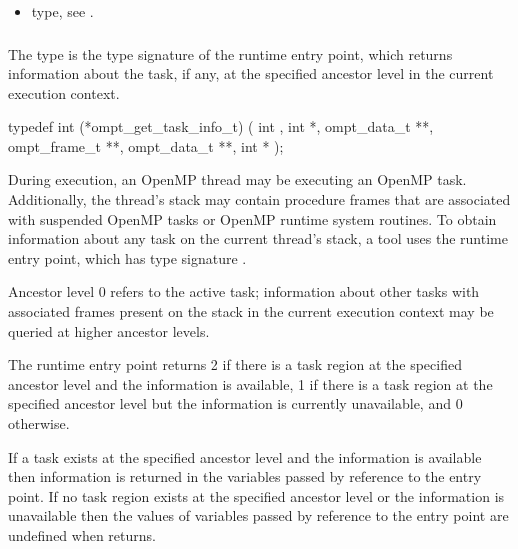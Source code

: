 \crossreferences
\begin{itemize}
\item {} type, see .
\end{itemize}



\subsubsection{}
\label{sec:ompt_get_task_info_t}
\label{sec:ompt_get_task_info}

\summary
The  type is the type signature of the 
 runtime entry point, which returns information 
about the task, if any, at the specified ancestor level in the current 
execution context.

\format
\begin{ccppspecific}
\begin{omptInquiry}
typedef int (*ompt_get_task_info_t) (
  int ,
  int *,
  ompt_data_t **,
  ompt_frame_t **,
  ompt_data_t **,
  int *
);
\end{omptInquiry}
\end{ccppspecific}

\descr
During execution, an OpenMP thread may be executing an OpenMP task.
Additionally, the thread's stack may contain procedure frames that 
are associated with suspended OpenMP tasks or OpenMP runtime system 
routines. To obtain information about any task on the current thread's 
stack, a tool uses the  runtime entry point,
which has type signature .

Ancestor level 0 refers to the active task; information about other 
tasks with associated frames present on the stack in the current execution 
context may be queried at higher ancestor levels.

The  runtime entry point returns 2 if there 
is a task region at the specified ancestor level and the information 
is available, 1 if there is a task region at the specified ancestor 
level but the information is currently unavailable, and 0 otherwise.

If a task exists at the specified ancestor level and the information is 
available then information is returned in the variables passed by reference 
to the entry point. If no task region exists at the specified ancestor level 
or the information is unavailable then the values of variables passed by 
reference to the entry point are undefined when  returns.

